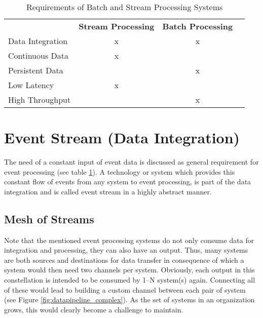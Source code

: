 \begin{table}[H]
\centering
\begin{tabular}{l|c|cl}
\multicolumn{1}{c|}{\textbf{}} & \textbf{Stream Processing} & \textbf{Batch
Processing} & \multicolumn{1}{c}{\textbf{}} \\ \cline{1-3}
Data Integration               & x                          & x
&                               \\
Continuous Data                & x                          &
&                               \\
Persistent Data                &                            & x
&                               \\
Low Latency                    & x                          &
&                               \\
High Throughput                     &                            & x
&
\end{tabular}
\caption{Requirements of Batch and Stream Processing Systems}
\label{table:requirements-batch-stream}
\end{table}

\section{Event Stream (Data Integration)}
The need of a constant input of event data is discussed as general requirement
for event processing (see table \ref{table:requirements-batch-stream}). A
technology or system which provides this constant flow of events from any
system to event processing, is part of the data integration and is called event
stream in a highly abstract manner.

\subsection{Mesh of Streams}
Note that the mentioned event processing systems do not only consume data for
integration and processing, they can also have an output. Thus, many systems are
both sources and destinations for data transfer in consequence of which a system
would then need two channels per system. Obviously, each output in
this constellation is intended to be consumed by 1--N system(s) again.
Connecting all of these would lead to building a custom channel between each
pair of system (see Figure \ref{fig:datapipeline_complex}). As the set of systems
in an organization grows, this would clearly become a challenge to maintain.

